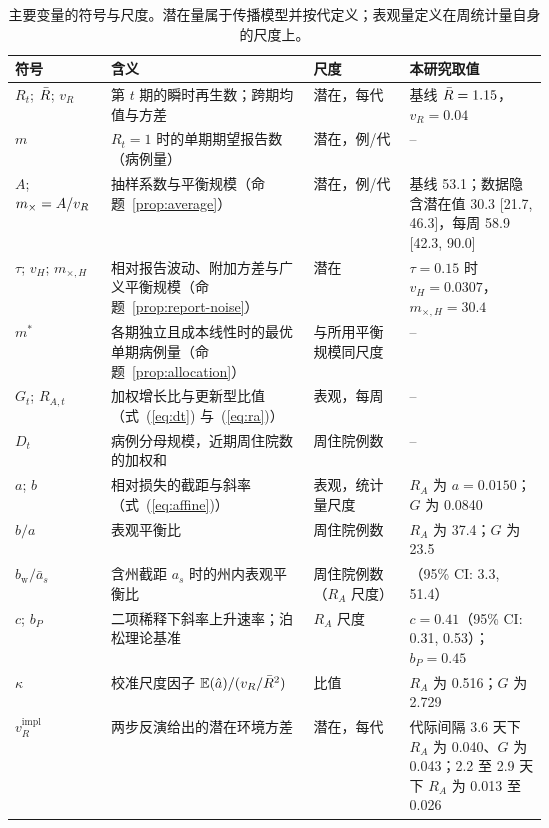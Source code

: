 \begin{table}[t]
\centering
\footnotesize
\caption{主要变量的符号与尺度。潜在量属于传播模型并按代定义；表观量定义在周统计量自身的尺度上。}
\label{tab:notation}
\begin{tabularx}{\linewidth}{>{\raggedright\arraybackslash}p{0.18\linewidth}>{\raggedright\arraybackslash}X>{\raggedright\arraybackslash}p{0.18\linewidth}>{\raggedright\arraybackslash}p{0.26\linewidth}}
\toprule
符号 & 含义 & 尺度 & 本研究取值 \\
\midrule
$R_t$; $\bar{R}$; $v_R$ & 第 $t$ 期的瞬时再生数；跨期均值与方差 & 潜在，每代 & 基线 $\bar{R}=1.15$，$v_R=0.04$ \\
$m$ & $R_t=1$ 时的单期期望报告数（病例量） & 潜在，例/代 & -- \\
$A$; $m_{\times}=A/v_R$ & 抽样系数与平衡规模（命题~\ref{prop:average}） & 潜在，例/代 & 基线 53.1；数据隐含潜在值 30.3 [21.7, 46.3]，每周 58.9 [42.3, 90.0] \\
$\tau$; $v_H$; $m_{\times,H}$ & 相对报告波动、附加方差与广义平衡规模（命题~\ref{prop:report-noise}） & 潜在 & $\tau=0.15$ 时 $v_H=0.0307$，$m_{\times,H}=30.4$ \\
$m^*$ & 各期独立且成本线性时的最优单期病例量（命题~\ref{prop:allocation}） & 与所用平衡规模同尺度 & -- \\
$G_t$; $R_{A,t}$ & 加权增长比与更新型比值（式~(\ref{eq:dt}) 与~(\ref{eq:ra})） & 表观，每周 & -- \\
$D_t$ & 病例分母规模，近期周住院数的加权和 & 周住院例数 & -- \\
$a$; $b$ & 相对损失的截距与斜率（式~(\ref{eq:affine})） & 表观，统计量尺度 & $R_A$ 为 $a=0.0150$；$G$ 为 0.0840 \\
$b/a$ & 表观平衡比 & 周住院例数 & $R_A$ 为 37.4；$G$ 为 23.5 \\
$b_{\mathrm{w}}/\bar{a}_s$ & 含州截距 $a_s$ 时的州内表观平衡比 & 周住院例数（$R_A$ 尺度） & 17.3（95\% CI: 3.3, 51.4） \\
$c$; $b_P$ & 二项稀释下斜率上升速率；泊松理论基准 & $R_A$ 尺度 & $c=0.41$（95\% CI: 0.31, 0.53）；$b_P=0.45$ \\
$\kappa$ & 校准尺度因子 $\mathbb{E}(\hat{a})/(v_R/\bar{R}^2)$ & 比值 & $R_A$ 为 0.516；$G$ 为 2.729 \\
$v_R^{\mathrm{impl}}$ & 两步反演给出的潜在环境方差 & 潜在，每代 & 代际间隔 3.6 天下 $R_A$ 为 0.040、$G$ 为 0.043；2.2 至 2.9 天下 $R_A$ 为 0.013 至 0.026 \\
\bottomrule
\end{tabularx}
\end{table}

